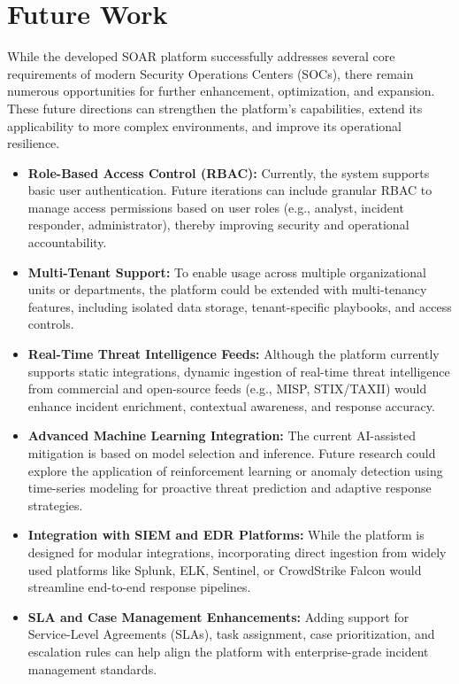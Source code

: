 \section{Future Work}

While the developed SOAR platform successfully addresses several core requirements of modern Security Operations Centers (SOCs), there remain numerous opportunities for further enhancement, optimization, and expansion. These future directions can strengthen the platform's capabilities, extend its applicability to more complex environments, and improve its operational resilience.

\begin{itemize}
    \item \textbf{Role-Based Access Control (RBAC):} Currently, the system supports basic user authentication. Future iterations can include granular RBAC to manage access permissions based on user roles (e.g., analyst, incident responder, administrator), thereby improving security and operational accountability.
    
    \item \textbf{Multi-Tenant Support:} To enable usage across multiple organizational units or departments, the platform could be extended with multi-tenancy features, including isolated data storage, tenant-specific playbooks, and access controls.

    \item \textbf{Real-Time Threat Intelligence Feeds:} Although the platform currently supports static integrations, dynamic ingestion of real-time threat intelligence from commercial and open-source feeds (e.g., MISP, STIX/TAXII) would enhance incident enrichment, contextual awareness, and response accuracy.

    \item \textbf{Advanced Machine Learning Integration:} The current AI-assisted mitigation is based on model selection and inference. Future research could explore the application of reinforcement learning or anomaly detection using time-series modeling for proactive threat prediction and adaptive response strategies.

    \item \textbf{Integration with SIEM and EDR Platforms:} While the platform is designed for modular integrations, incorporating direct ingestion from widely used platforms like Splunk, ELK, Sentinel, or CrowdStrike Falcon would streamline end-to-end response pipelines.

    \item \textbf{SLA and Case Management Enhancements:} Adding support for Service-Level Agreements (SLAs), task assignment, case prioritization, and escalation rules can help align the platform with enterprise-grade incident management standards.


\end{itemize}
